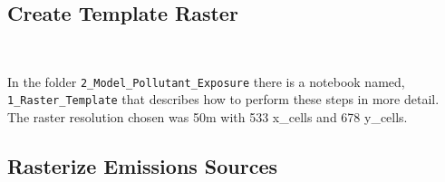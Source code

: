 \documentclass[article,12pt]{article}
\numberwithin{equation}{section}
\begin{document}
\subsection{Create Template Raster}
\begin{adjustwidth}{-.88in}{-.88in}
	\begin{center}
		\\
		
	\end{center}
\end{adjustwidth}
\vspace{.5in}

In the folder \texttt{2\_Model\_Pollutant\_Exposure} there is a notebook named, \texttt{1\_Raster\_Template} that describes how to perform these steps in more detail. The raster resolution chosen was 50m with 533 x\_cells and 678 y\_cells.

\subsection{Rasterize Emissions Sources}
\begin{adjustwidth}{-.88in}{-.88in}
	\begin{center}
		\\
		
	\end{center}
\end{adjustwidth}
\vspace{.5in}
\end{document}
